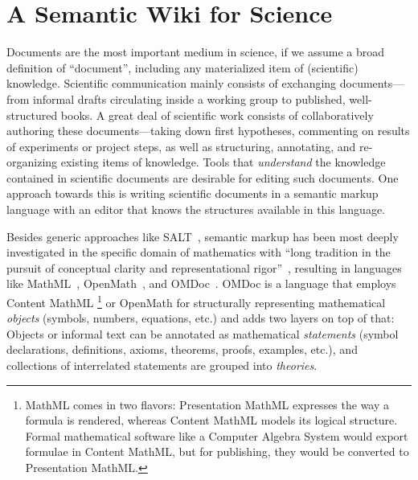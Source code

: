\section{A Semantic Wiki for Science}

\begin{figure}
  \centering
  \vspace{-.9cm}
  \vspace{-1.2cm}
\end{figure}
Documents are the most important medium in science, if we assume a broad definition of
``document'', including any materialized item of (scientific) knowledge.  Scientific
communication mainly consists of exchanging documents---from informal drafts circulating
inside a working group to published, well-structured books.  A great deal of scientific
work consists of collaboratively authoring these documents---taking down first hypotheses,
commenting on results of experiments or project steps, as well as structuring, annotating,
and re-organizing existing items of knowledge.  Tools that
\emph{understand} the knowledge contained in scientific documents are desirable for
editing such documents.  One approach towards this is writing scientific documents in a
semantic markup language with an editor that knows the structures available in this
language.

Besides generic approaches like SALT~\cite{Groza:SALT07}, semantic markup has been most
deeply investigated in the specific domain of mathematics with ``long tradition in the
pursuit of conceptual clarity and representational rigor''~\cite{Kohlhase:omdoc1.2},
resulting in languages like MathML~\cite{CarlisleEd:MathML07},
OpenMath~\cite{BusCapCar:2oms04}, and OMDoc~\cite{Kohlhase:omdoc1.2}.  OMDoc is a language
that employs Content MathML
\footnote{MathML comes in two flavors: Presentation MathML
  expresses the way a formula is rendered, whereas Content MathML models its logical
  structure.  Formal mathematical software like a Computer Algebra System would export
  formulae in Content MathML, but for publishing, they would be converted to Presentation
  MathML.} 
or OpenMath for structurally representing mathematical \emph{objects} (symbols,
numbers, equations, etc.) and adds two layers on top of that: Objects or informal text can
be annotated as mathematical \emph{statements} (symbol declarations, definitions, axioms,
theorems, proofs, examples, etc.), and collections of interrelated statements are grouped
into \emph{theories}.

